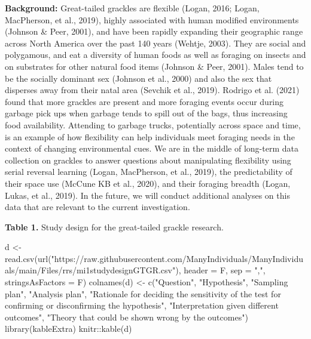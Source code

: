 \documentclass[
]{article}
\newenvironment{Shaded}{\begin{snugshade}}{\end{snugshade}}
\newcommand{\AttributeTok}[1]{\textcolor[rgb]{0.77,0.63,0.00}{#1}}
\newcommand{\FunctionTok}[1]{\textcolor[rgb]{0.00,0.00,0.00}{#1}}
\newcommand{\NormalTok}[1]{#1}
\newcommand{\OtherTok}[1]{\textcolor[rgb]{0.56,0.35,0.01}{#1}}
\newcommand{\SpecialCharTok}[1]{\textcolor[rgb]{0.00,0.00,0.00}{#1}}
\newcommand{\StringTok}[1]{\textcolor[rgb]{0.31,0.60,0.02}{#1}}
\begin{document}
\textbf{Background:} Great-tailed grackles are flexible (Logan, 2016;
Logan, MacPherson, et al., 2019), highly associated with human modified
environments (Johnson \& Peer, 2001), and have been rapidly expanding
their geographic range across North America over the past 140 years
(Wehtje, 2003). They are social and polygamous, and eat a diversity of
human foods as well as foraging on insects and on substrates for other
natural food items (Johnson \& Peer, 2001). Males tend to be the
socially dominant sex (Johnson et al., 2000) and also the sex that
disperses away from their natal area (Sevchik et al., 2019). Rodrigo et
al. (2021) found that more grackles are present and more foraging events
occur during garbage pick ups when garbage tends to spill out of the
bags, thus increasing food availability. Attending to garbage trucks,
potentially across space and time, is an example of how flexibility can
help individuals meet foraging needs in the context of changing
environmental cues. We are in the middle of long-term data collection on
grackles to answer questions about manipulating flexibility using serial
reversal learning (Logan, MacPherson, et al., 2019), the predictability
of their space use (McCune KB et al., 2020), and their foraging breadth
(Logan, Lukas, et al., 2019). In the future, we will conduct additional
analyses on this data that are relevant to the current investigation.

\textbf{Table 1.} Study design for the great-tailed grackle research.

\begin{Shaded}
\begin{Highlighting}[]
\NormalTok{d }\OtherTok{\textless{}{-}} \FunctionTok{read.csv}\NormalTok{(}\FunctionTok{url}\NormalTok{(}\StringTok{"https://raw.githubusercontent.com/ManyIndividuals/ManyIndividuals/main/Files/rrs/mi1studydesignGTGR.csv"}\NormalTok{),}
    \AttributeTok{header =}\NormalTok{ F, }\AttributeTok{sep =} \StringTok{","}\NormalTok{, }\AttributeTok{stringsAsFactors =}\NormalTok{ F)}
\FunctionTok{colnames}\NormalTok{(d) }\OtherTok{\textless{}{-}} \FunctionTok{c}\NormalTok{(}\StringTok{"Question"}\NormalTok{, }\StringTok{"Hypothesis"}\NormalTok{, }\StringTok{"Sampling plan"}\NormalTok{, }\StringTok{"Analysis plan"}\NormalTok{,}
    \StringTok{"Rationale for deciding the sensitivity of the test for confirming or disconfirming the hypothesis"}\NormalTok{,}
    \StringTok{"Interpretation given different outcomes"}\NormalTok{, }\StringTok{"Theory that could be shown wrong by the outcomes"}\NormalTok{)}
\FunctionTok{library}\NormalTok{(kableExtra)}
\NormalTok{knitr}\SpecialCharTok{::}\FunctionTok{kable}\NormalTok{(d)}
\end{Highlighting}
\end{Shaded}
\end{document}
